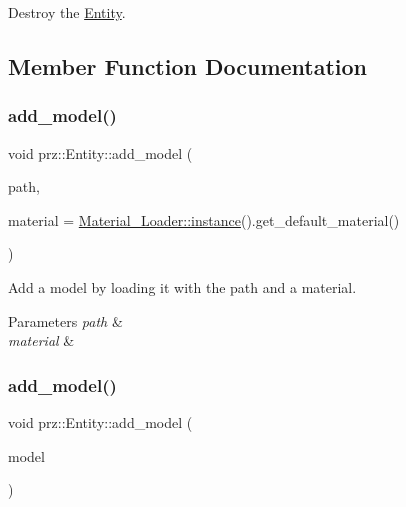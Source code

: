 Destroy the \mbox{\hyperlink{classprz_1_1_entity}{Entity}}. 



\subsection{Member Function Documentation}
\mbox{\label{classprz_1_1_entity_ad05faa4499acdf692cbb4da278eaa329}} 
\subsubsection{\texorpdfstring{add\_model()}{add\_model()}\hspace{0.1cm}{\footnotesize\ttfamily [1/2]}}
{\footnotesize\ttfamily void prz\+::\+Entity\+::add\+\_\+model (\begin{DoxyParamCaption}\item[{const P\+String \&}]{path,  }\item[{P\+S\+Ptr$<$ \mbox{\hyperlink{classprz_1_1_material}{Material}} $>$}]{material = {\ttfamily \mbox{\hyperlink{classprz_1_1_material___loader_a5fa3903db95525602037c029debb6532}{Material\+\_\+\+Loader\+::instance}}().get\+\_\+default\+\_\+material()} }\end{DoxyParamCaption})\hspace{0.3cm}{\ttfamily [inline]}}



Add a model by loading it with the path and a material. 


\begin{DoxyParams}{Parameters}
{\em path} & \\
\hline
{\em material} & \\
\hline
\end{DoxyParams}
\mbox{\label{classprz_1_1_entity_a6006671c0683f0cfdfb827c66b7e37de}} 
\subsubsection{\texorpdfstring{add\_model()}{add\_model()}\hspace{0.1cm}{\footnotesize\ttfamily [2/2]}}
{\footnotesize\ttfamily void prz\+::\+Entity\+::add\+\_\+model (\begin{DoxyParamCaption}\item[{P\+S\+Ptr$<$ \mbox{\hyperlink{classprz_1_1_model}{Model}} $>$}]{model }\end{DoxyParamCaption})\hspace{0.3cm}{\ttfamily [inline]}}



